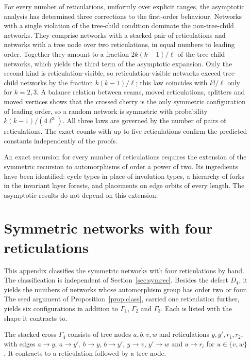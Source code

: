 \documentclass[11pt,a4paper]{article}
\theoremstyle{definition}
\begin{document}
For every number of reticulations, uniformly over explicit ranges, the asymptotic analysis has determined three corrections to the first-order behaviour. Networks with a single violation of the tree-child condition dominate the non-tree-child networks. They comprise networks with a stacked pair of reticulations and networks with a tree node over two reticulations, in equal numbers to leading order. Together they amount to a fraction $2k(k-1)/\ell$ of the tree-child networks, which yields the third term of the asymptotic expansion. Only the second kind is reticulation-visible, so reticulation-visible networks exceed tree-child networks by the fraction $k(k-1)/\ell$; this law coincides with $k!/\ell$ only for $k=2,3$. A balance relation between seams, moved reticulations, splitters and moved vertices shows that the crossed cherry is the only symmetric configuration of leading order, so a random network is symmetric with probability $k(k-1)/(4\ell^3)$. All three laws are governed by the number of pairs of reticulations. The exact counts with up to five reticulations confirm the predicted constants independently of the proofs.

An exact recursion for every number of reticulations requires the extension of the symmetric recursion to automorphisms of order a power of two. Its ingredients have been identified: cycle types in place of involution types, a hierarchy of forks in the invariant layer forests, and placements on edge orbits of every length. The asymptotic results do not depend on this extension.


\appendix
\section{Symmetric networks with four reticulations}\label{app:k4}

This appendix classifies the symmetric networks with four reticulations by hand. The classification is independent of Section~\ref{sec:symrec}. Besides the defect $D_4$, it yields the numbers of networks whose automorphism group has order two or four. The seed argument of Proposition~\ref{prop:class}, carried one reticulation further, yields six configurations in addition to $\Gamma_1$, $\Gamma_2$ and $\Gamma_3$. Each is listed with the shape it contracts to.

The stacked cross $\Gamma_4$ consists of tree nodes $a,b,v,w$ and reticulations $y,y',r_1,r_2$, with edges $a\to y$, $a\to y'$, $b\to y$, $b\to y'$, $y\to v$, $y'\to w$ and $u\to r_i$ for $u\in\{v,w\}$. It contracts to a reticulation followed by a tree node.
\end{document}
